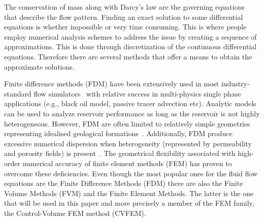 \documentclass[preprint,authoryear,12pt]{elsarticle}
\newcommand{\KCnote}[1]{\fbox{\parbox{\textwidth}{ \color{black} KC Note $\Rightarrow$ #1}}}
\newcommand{\blue}{\textcolor{blue}}
\begin{document}
\KCnote{ \blue{need to move it in a later section}
\begin{equation}
 MR \; = \frac{k_{rw} \; \mu_{w}}{k_{ro} \; \mu_{o}} 
\label{eq:MR}
\end{equation}
}


\medskip
The conservation of mass along with Darcy's law are the governing equations that describe the flow pattern. Finding an exact solution to some differential  equations is whether impossible or very time consuming. This is where people employ numerical analysis schemes to address the issue by creating a sequence  of approximations. This is done through discretization of the continuous differential equations. Therefore there are several methods that offer a means to obtain the approximate solutions.

\medskip 
Finite difference methods (FDM) have been extensively used in most industry-standard flow simulators~\citep{aziz_1986, chen_2005, chang_1990} with relative success in multi-physics single phase applications (e.g., black oil model, passive tracer advection etc). Analytic models can be used to analyze reservoir performance as long as the reservoir is not highly heterogeneous. However, FDM are often limited to relatively simple geometries 
representing idealised geological formations~\citep{mlacnik_2004, king_1999}. Additionally, FDM produce excessive numerical dispersion when heterogeneity (represented by permeability and porosity fields) is present~\citep{chavent_1986}. The geometrical flexibility associated with high-order numerical accuracy of finite element methods (FEM) has proven to overcome these deficiencies. Even though the most popular ones for the fluid flow equations are the Finite Difference Methods (FDM) there are also the Finite Volume Methods (FVM) and the Finite Element Methods. The latter is the one that will be used in this paper and more precisely a member of the FEM family, the Control-Volume FEM method (CVFEM). 
\end{document}
